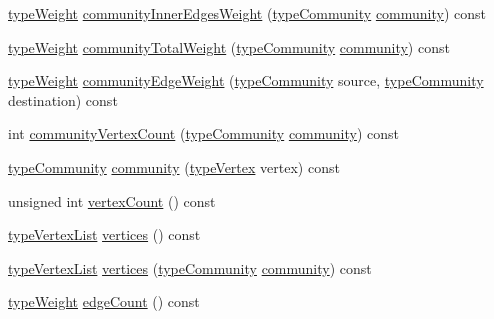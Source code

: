 \begin{DoxyCompactItemize}
\item 
\hyperlink{edge_8h_a2e7ea3be891ac8b52f749ec73fee6dd2}{type\+Weight} \hyperlink{classDynCommBase_ada91e7e914eb8be7f8c25f4c0c81156a}{community\+Inner\+Edges\+Weight} (\hyperlink{graphUndirectedGroupable_8h_a914da95c9ea7f14f4b7f875c36818556}{type\+Community} \hyperlink{classDynCommBase_a651753518a2de4ea52caea518e74d878}{community}) const
\item 
\hyperlink{edge_8h_a2e7ea3be891ac8b52f749ec73fee6dd2}{type\+Weight} \hyperlink{classDynCommBase_a9e7f2493dd9f2381dbfbe94b91ac49f4}{community\+Total\+Weight} (\hyperlink{graphUndirectedGroupable_8h_a914da95c9ea7f14f4b7f875c36818556}{type\+Community} \hyperlink{classDynCommBase_a651753518a2de4ea52caea518e74d878}{community}) const
\item 
\hyperlink{edge_8h_a2e7ea3be891ac8b52f749ec73fee6dd2}{type\+Weight} \hyperlink{classDynCommBase_a1ef408ec71d82b008fc0229416c77b61}{community\+Edge\+Weight} (\hyperlink{graphUndirectedGroupable_8h_a914da95c9ea7f14f4b7f875c36818556}{type\+Community} source, \hyperlink{graphUndirectedGroupable_8h_a914da95c9ea7f14f4b7f875c36818556}{type\+Community} destination) const
\item 
int \hyperlink{classDynCommBase_ad02f1853b63e1ceaf24b05cfdbcf7a49}{community\+Vertex\+Count} (\hyperlink{graphUndirectedGroupable_8h_a914da95c9ea7f14f4b7f875c36818556}{type\+Community} \hyperlink{classDynCommBase_a651753518a2de4ea52caea518e74d878}{community}) const
\item 
\hyperlink{graphUndirectedGroupable_8h_a914da95c9ea7f14f4b7f875c36818556}{type\+Community} \hyperlink{classDynCommBase_a651753518a2de4ea52caea518e74d878}{community} (\hyperlink{edge_8h_a5fbd20c46956d479cb10afc9855223f6}{type\+Vertex} vertex) const
\item 
unsigned int \hyperlink{classDynCommBase_ae415f1a7792158845f69d6850b762d87}{vertex\+Count} () const
\item 
\hyperlink{graphInterface_8h_a21d54d8a139def524d3b0d6f71ec4974}{type\+Vertex\+List} \hyperlink{classDynCommBase_ae240fba572935f26a72f73e39e115169}{vertices} () const
\item 
\hyperlink{graphInterface_8h_a21d54d8a139def524d3b0d6f71ec4974}{type\+Vertex\+List} \hyperlink{classDynCommBase_ae56cd1fc5a69fcd4d0e0a073f3f2e36b}{vertices} (\hyperlink{graphUndirectedGroupable_8h_a914da95c9ea7f14f4b7f875c36818556}{type\+Community} \hyperlink{classDynCommBase_a651753518a2de4ea52caea518e74d878}{community}) const
\item 
\hyperlink{edge_8h_a2e7ea3be891ac8b52f749ec73fee6dd2}{type\+Weight} \hyperlink{classDynCommBase_a5f7d75431e0f774c1c92f096d6a7c429}{edge\+Count} () const

\end{DoxyCompactItemize}
